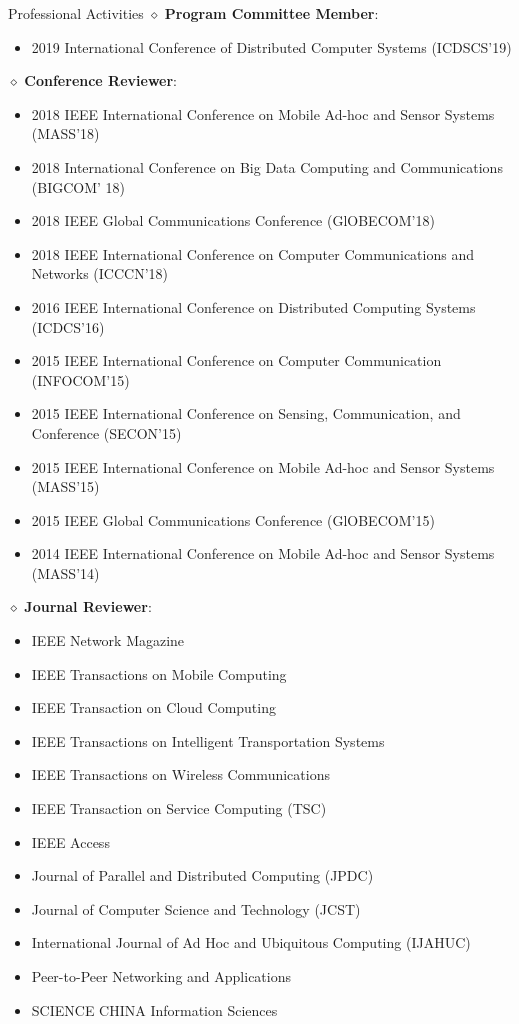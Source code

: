 \documentclass{resume} %
\begin{document}

\begin{rSection}{Professional Activities}
$\diamond$  {\bf Program Committee Member}: 
\begin{itemize}
    \item 2019 International Conference of Distributed Computer Systems (ICDSCS'19)
\end{itemize}


$\diamond$ {\bf  Conference Reviewer}: 
\begin{itemize}
\item 2018 IEEE International Conference on Mobile Ad-hoc and Sensor Systems  (MASS'18)
\item 2018 International Conference on Big Data Computing and Communications (BIGCOM' 18)
\item 2018 IEEE Global Communications Conference  (GlOBECOM'18)
\item 2018 IEEE International Conference on Computer Communications and Networks (ICCCN'18)
\item  2016 IEEE International Conference on Distributed Computing Systems (ICDCS'16)
\item 2015 IEEE International Conference on Computer Communication (INFOCOM'15) \item 2015 IEEE International Conference on Sensing, Communication, and Conference (SECON'15)
\item 2015 IEEE International Conference on Mobile Ad-hoc and Sensor Systems (MASS'15) 
\item 2015 IEEE Global Communications Conference  (GlOBECOM'15) 
\item 2014 IEEE International Conference on Mobile Ad-hoc and Sensor Systems (MASS'14)
\end{itemize}

$\diamond$ {\bf Journal Reviewer}: 
\begin{itemize}
\item IEEE Network Magazine
\item IEEE Transactions on Mobile Computing
\item IEEE Transaction on Cloud Computing
\item IEEE Transactions on Intelligent Transportation Systems
\item IEEE Transactions on Wireless Communications
\item IEEE Transaction on Service Computing (TSC)
\item IEEE Access
\item Journal of Parallel and Distributed Computing (JPDC)
\item Journal of Computer Science and Technology (JCST)
\item International Journal of Ad Hoc and Ubiquitous Computing (IJAHUC)
\item Peer-to-Peer Networking and Applications
\item SCIENCE CHINA Information Sciences
\end{itemize}
\end{rSection}
\end{document}
